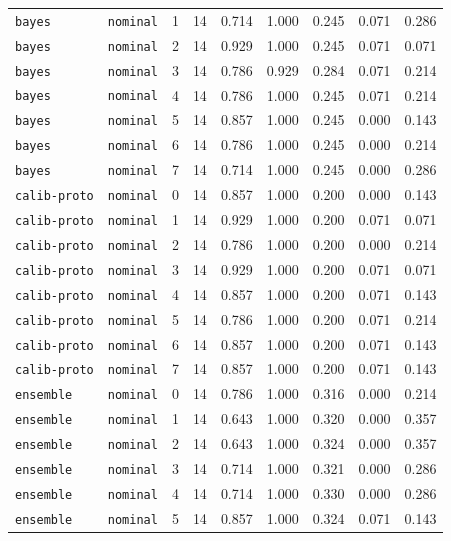 \documentclass{article}
\begin{document}
\begin{center}
{\begin{tabular}{llllccccc}
\texttt{bayes} & \texttt{nominal} & 1 & 14 & 0.714 & 1.000 & 0.245 & 0.071 & 0.286 \\
\texttt{bayes} & \texttt{nominal} & 2 & 14 & 0.929 & 1.000 & 0.245 & 0.071 & 0.071 \\
\texttt{bayes} & \texttt{nominal} & 3 & 14 & 0.786 & 0.929 & 0.284 & 0.071 & 0.214 \\
\texttt{bayes} & \texttt{nominal} & 4 & 14 & 0.786 & 1.000 & 0.245 & 0.071 & 0.214 \\
\texttt{bayes} & \texttt{nominal} & 5 & 14 & 0.857 & 1.000 & 0.245 & 0.000 & 0.143 \\
\texttt{bayes} & \texttt{nominal} & 6 & 14 & 0.786 & 1.000 & 0.245 & 0.000 & 0.214 \\
\texttt{bayes} & \texttt{nominal} & 7 & 14 & 0.714 & 1.000 & 0.245 & 0.000 & 0.286 \\
\texttt{calib-proto} & \texttt{nominal} & 0 & 14 & 0.857 & 1.000 & 0.200 & 0.000 & 0.143 \\
\texttt{calib-proto} & \texttt{nominal} & 1 & 14 & 0.929 & 1.000 & 0.200 & 0.071 & 0.071 \\
\texttt{calib-proto} & \texttt{nominal} & 2 & 14 & 0.786 & 1.000 & 0.200 & 0.000 & 0.214 \\
\texttt{calib-proto} & \texttt{nominal} & 3 & 14 & 0.929 & 1.000 & 0.200 & 0.071 & 0.071 \\
\texttt{calib-proto} & \texttt{nominal} & 4 & 14 & 0.857 & 1.000 & 0.200 & 0.071 & 0.143 \\
\texttt{calib-proto} & \texttt{nominal} & 5 & 14 & 0.786 & 1.000 & 0.200 & 0.071 & 0.214 \\
\texttt{calib-proto} & \texttt{nominal} & 6 & 14 & 0.857 & 1.000 & 0.200 & 0.071 & 0.143 \\
\texttt{calib-proto} & \texttt{nominal} & 7 & 14 & 0.857 & 1.000 & 0.200 & 0.071 & 0.143 \\
\texttt{ensemble} & \texttt{nominal} & 0 & 14 & 0.786 & 1.000 & 0.316 & 0.000 & 0.214 \\
\texttt{ensemble} & \texttt{nominal} & 1 & 14 & 0.643 & 1.000 & 0.320 & 0.000 & 0.357 \\
\texttt{ensemble} & \texttt{nominal} & 2 & 14 & 0.643 & 1.000 & 0.324 & 0.000 & 0.357 \\
\texttt{ensemble} & \texttt{nominal} & 3 & 14 & 0.714 & 1.000 & 0.321 & 0.000 & 0.286 \\
\texttt{ensemble} & \texttt{nominal} & 4 & 14 & 0.714 & 1.000 & 0.330 & 0.000 & 0.286 \\
\texttt{ensemble} & \texttt{nominal} & 5 & 14 & 0.857 & 1.000 & 0.324 & 0.071 & 0.143 \\
\bottomrule
\end{tabular}%
}
\end{center}
\end{document}
